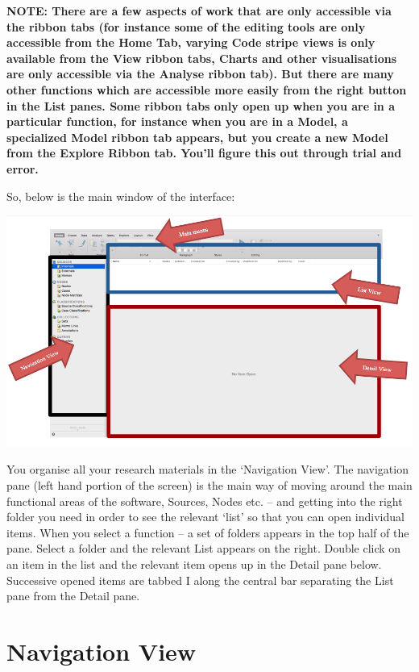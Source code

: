 \documentclass[]{book}
\theoremstyle{definition}
\theoremstyle{definition}
\theoremstyle{definition}
\theoremstyle{remark}
\begin{document}
\textbf{NOTE: There are a few aspects of work that are only accessible
via the ribbon tabs (for instance some of the editing tools are only
accessible from the Home Tab, varying Code stripe views is only
available from the View ribbon tabs, Charts and other visualisations are
only accessible via the Analyse ribbon tab). But there are many other
functions which are accessible more easily from the right button in the
List panes. Some ribbon tabs only open up when you are in a particular
function, for instance when you are in a Model, a specialized Model
ribbon tab appears, but you create a new Model from the Explore Ribbon
tab. You'll figure this out through trial and error.}

So, below is the main window of the interface:

\includegraphics{imgs/qual_09.png}

You organise all your research materials in the `Navigation View'. The
navigation pane (left hand portion of the screen) is the main way of
moving around the main functional areas of the software, Sources, Nodes
etc. -- and getting into the right folder you need in order to see the
relevant `list' so that you can open individual items. When you select a
function -- a set of folders appears in the top half of the pane. Select
a folder and the relevant List appears on the right. Double click on an
item in the list and the relevant item opens up in the Detail pane
below. Successive opened items are tabbed I along the central bar
separating the List pane from the Detail pane.

\hypertarget{navigation-view}{%
\section{Navigation View}\label{navigation-view}}
\end{document}

